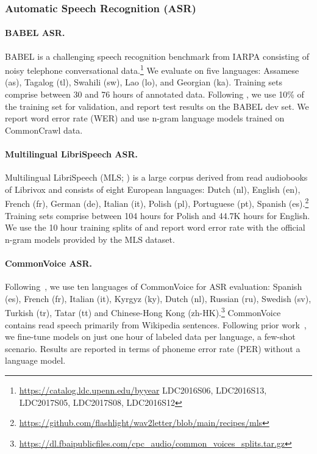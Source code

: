 \documentclass{article} \usepackage{iclr2022_conference,times}
\begin{document}
\subsubsection{Automatic Speech Recognition (ASR)}
\label{sec:setup_asr}

\paragraph{BABEL ASR.}{BABEL is a challenging speech recognition benchmark from IARPA consisting of noisy telephone conversational data.\footnote{\small\url{https://catalog.ldc.upenn.edu/byyear} \tiny{LDC2016S06, LDC2016S13, LDC2017S05, LDC2017S08, LDC2016S12}} 
We evaluate on five languages: Assamese (as), Tagalog (tl), Swahili (sw), Lao (lo), and Georgian (ka). Training sets comprise between 30 and 76 hours of annotated data. Following \cite{conneau2021xlsr}, we use 10\% of the training set for validation, and report test results on the BABEL dev set. We report word error rate (WER) and use n-gram language models trained on CommonCrawl data.
}

\paragraph{Multilingual LibriSpeech ASR.}{Multilingual LibriSpeech (MLS; \citealt{pratap2020mls}) is a large corpus derived from read audiobooks of Librivox and consists of eight European languages: Dutch (nl), English (en), French (fr), German (de), Italian (it), Polish (pl), Portuguese (pt), Spanish (es).\footnote{\small\url{https://github.com/flashlight/wav2letter/blob/main/recipes/mls}} Training sets comprise between 104 hours for Polish and 44.7K hours for English. 
We use the 10 hour training splits of \cite{conneau2021xlsr} and report word error rate with the official n-gram models provided by the MLS dataset.
}

\paragraph{CommonVoice ASR.}{
Following~\cite{rivire2020unsupervised}, we use ten languages of CommonVoice for ASR evaluation: Spanish (es), French (fr), Italian (it), Kyrgyz (ky), Dutch (nl), Russian (ru), Swedish (sv), Turkish (tr), Tatar (tt) and Chinese-Hong Kong (zh-HK).\footnote{\small\url{https://dl.fbaipublicfiles.com/cpc_audio/common_voices_splits.tar.gz}}
CommonVoice contains read speech primarily from Wikipedia sentences. Following prior work~\citep{rivire2020unsupervised,conneau2021xlsr}, we fine-tune models on just one hour of labeled data per language, a few-shot scenario. Results are reported in terms of phoneme error rate (PER) without a language model.
}
\end{document}
